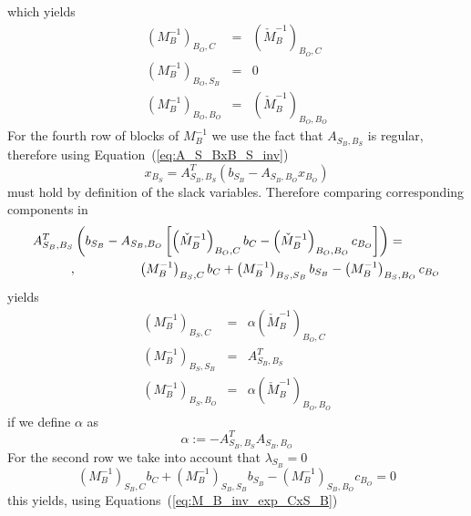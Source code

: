\documentclass[a4paper]{article}
\begin{document}
which yields
\begin{eqnarray}
\label{eq:M_B_inv_exp_B_OxC}
\left(M_{B}^{-1}\right)_{B_{O},C} &=&
  \left(\check{M}_{B}^{-1}\right)_{B_{O},C} \\
\label{eq:M_B_inv_exp_B_OxS_B}
\left(M_{B}^{-1}\right)_{B_{O},S_{B}} &=& 0 \\
\label{eq:M_B_inv_exp_B_OxB_O}
\left(M_{B}^{-1}\right)_{B_{O},B_{O}}&=&
  \left(\check{M}_{B}^{-1}\right)_{B_{O},B_{O}}
\end{eqnarray}
For the fourth row of blocks of $M_{B}^{-1}$ we use the fact that
$A_{S_{B},B_{S}}$ is regular, therefore using
Equation~(\ref{eq:A_S_BxB_S_inv}) 
\begin{equation}
\label{eq:x_B_S}
x_{B_{S}} = A_{S_{B},B_{S}}^{T}\left(b_{S_{B}} - 
A_{S_{B}, B_{O}}x_{B_{O}}\right)
\end{equation}
must hold by definition of the slack variables. Therefore comparing
corresponding components in
\begin{eqnarray*}
\lefteqn{A_{S_{B},B_{S}}^{T}\left(b_{S_{B}} - 
A_{S_{B}, B_{O}}
\left[\left(\check{M}_{B}^{-1}\right)_{B_{O}, C}b_{C}
  - \left(\check{M}_{B}^{-1}\right)_{B_{O}, B_{O}} c_{B_{O}}\right]\right)
= } \\
& & \quad \quad ,\quad \quad \quad \quad \quad
\left(M_{B}^{-1}\right)_{B_{S}, C} b_{C}
  +\left(M_{B}^{-1}\right)_{B_{S}, S_{B}} b_{S_{B}}
  -\left(M_{B}^{-1}\right)_{B_{S}, B_{O}} c_{B_{O}} 
\end{eqnarray*}
yields
\begin{eqnarray}
\label{eq:M_B_inv_exp_B_SxC}
\left(M_{B}^{-1}\right)_{B_{S}, C} &=&
  \alpha\left(\check{M}_{B}^{-1}\right)_{B_{O},C} \\
\label{eq:M_B_inv_exp_B_SxS_B}
\left(M_{B}^{-1}\right)_{B_{S}, S_{B}} &=&
  A_{S_{B}, B_{S}}^{T} \\
\label{eq:M_B_inv_exp_B_SxB_O}
\left(M_{B}^{-1}\right)_{B_{S}, B_{O}} &=&
 \alpha\left(\check{M}_{B}^{-1}\right)_{B_{O},B_{O}}
\end{eqnarray}
if we define $\alpha$ as
\begin{equation}
\label{def:alpha}
\alpha := -A_{S_{B}, B_{S}}^{T}A_{S_{B}, B_{O}} 
\end{equation}
For the second row we take into account that $\lambda_{S_{B}}=0$
\begin{equation*}
\left(M_{B}^{-1}\right)_{S_{B}, C} b_{C}
  +\left(M_{B}^{-1}\right)_{S_{B}, S_{B}} b_{S_{B}}
  -\left(M_{B}^{-1}\right)_{S_{B}, B_{O}} c_{B_{O}}
= 0
\end{equation*}
this yields, using Equations~(\ref{eq:M_B_inv_exp_CxS_B})
\end{document}
